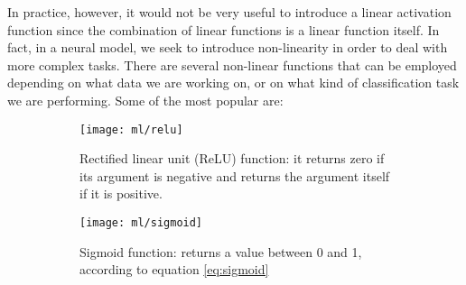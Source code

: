 \documentclass[11pt]{report}
\begin{document}
In practice, however, it would not be very useful to introduce a linear activation function since the combination of linear functions is a linear function itself.
In fact, in a neural model, we seek to introduce non-linearity in order to deal with more complex tasks.
There are several non-linear functions that can be employed depending on what data we are working on, or on what kind of classification task we are performing.
Some of the most popular are:


\begin{figure}
\centering
\begin{subfigure}{0.4\textwidth}
\texttt{[image: ml/relu]}
\caption{Rectified linear unit (ReLU) function: it returns zero if its argument is negative and returns the argument itself if it is positive.}
\end{subfigure}
\begin{subfigure}{0.4\textwidth}
\texttt{[image: ml/sigmoid]}
\caption{Sigmoid function: returns a value between 0 and 1, according to equation \ref{eq:sigmoid}}
\end{subfigure}
\caption{}
\end{figure}
\end{document}
